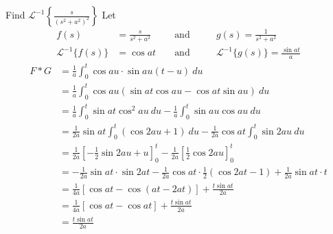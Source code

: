 \documentclass[12pt]{article}
\newcommand{\Lapinv}{\mathscr{L}^{-1}}
\begin{document}
\begin{example}{Find $\displaystyle \Lapinv \left\{ \frac{s}{(s^2+a^2)^2} \right\}$}{}
    Let 
    \begin{align*}
        f(s) &= \frac{s}{s^2+a^2} &&\text{ and } &&&g(s) = \frac{1}{s^2+a^2} \\
        \Lapinv \{ f(s) \} &= \cos{at} &&\text{ and } &&&\Lapinv \{ g(s) \} = \frac{\sin{at}}{a}
    \end{align*}
    \begin{align*}
        F*G &= \frac{1}{a}\int_{0}^{t} {\cos{au} \cdot \sin{au(t-u)}} \: d{u} \\
        &= \frac{1}{a} \int_{0}^{t} {\cos{au} (\sin{at}\cos{au} - \cos{at}\sin{au})} \: d{u} \\
        &= \frac{1}{a}\int_{0}^{t} {\sin{at}\cos^2{au}} \: d{u} - \frac{1}{a}\int_{0}^{t} {\sin{au}\cos{au}} \: d{u} \\
        &= \frac{1}{2a}\sin{at}\int_{0}^{t} {(\cos{2au}+1)} \: d{u} - \frac{1}{2a}\cos{at}\int_{0}^{t} {\sin{2au}} \: d{u} \\
        &= \frac{1}{2a} \left[ -\frac{1}{2}\sin{2au} + u \right]_0^t - \frac{1}{2a} \left[ \frac{1}{2}\cos{2au} \right]_0^t \\
        &= -\frac{1}{2a}\sin{at}\cdot\sin{2at} - \frac{1}{2a}\cos{at}\cdot\frac{1}{2}(\cos{2at}-1) + \frac{1}{2a}\sin{at}\cdot t \\
        &= \frac{1}{4a} \left[ \cos{at} - \cos{(at - 2at)} \right] + \frac{t\sin{at}}{2a} \\
        &= \frac{1}{4a} \left[ \cos{at} - \cos{at} \right] + \frac{t\sin{at}}{2a} \\
        &= \frac{t\sin{at}}{2a}
    \end{align*}
\end{example}
\end{document}
